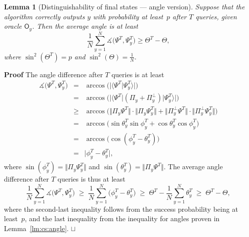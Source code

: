 \documentclass{article}
\newtheorem{lemma}[theorem]{Lemma}
\def\squareforqed{\hbox{\rlap{$\sqcap$}$\sqcup$}}
\def\qed{\ifmmode\squareforqed\else{\unskip\nobreak\hfil
\penalty50\hskip1em\null\nobreak\hfil\squareforqed
\parfillskip=0pt\finalhyphendemerits=0\endgraf}\fi}
\newenvironment{proof}{\begin{trivlist}\item[]{\flushleft\bf Proof }}
{\qed\end{trivlist}}
\newcommand{\op}[1]{\mathsf{#1}}
\newcommand{\proj}{\mathsf{\Pi}}
\begin{document}
\begin{lemma}
[Distinguishability of final states --- angle version]
\label{lm:final:angle}
Suppose that the algorithm correctly outputs $y$ with probability at
least~$p$ after $T$ queries, given oracle $\op{O}_y$.  Then the
average angle is at least
\begin{equation}
  \frac{1}{N}\sum\limits_{y=1}^{N}
  \measuredangle \big( \Psi^{T},\Psi^{T}_{y}\big)
  \geq \Theta^{T}-\Theta,
\end{equation}
where $\sin^2(\Theta^T) = p$ and $\sin^2(\Theta) = \frac{1}{N}$.
\end{lemma}

\begin{proof}
  The angle difference after $T$ queries is at least
\begin{eqnarray*}
  \measuredangle \big(\Psi^{T}, \Psi^{T}_{y}\big) 
  &=& \arccos \big( \big\vert \langle \Psi^{T} \vert \Psi^{T}_{y}\rangle \big\vert\big) \\
  &=& \arccos \big( \big\vert \langle \Psi^{T} \vert (\proj_y + \proj_y^{\perp}) \vert
  \Psi^{T}_{y}\rangle \big\vert\big) \\
  &\geq& \arccos \big( 
  \big\Vert \proj_y \Psi^{T} \big\Vert \cdot
  \big\Vert \proj_y \Psi^{T}_{y} \big\Vert +
  \big\Vert \proj_y^{\perp} \Psi^{T} \big\Vert \cdot
  \big\Vert \proj_y^{\perp} \Psi^{T}_{y} \big\Vert \big)\\
  &=&\arccos \big( \sin \theta_{y}^{T}\sin \phi_{y}^{T} +
  \cos \theta_{y}^{T} \cos \phi_{y}^{T}\big) \\
  &=&\arccos \big(\cos (\phi_{y}^{T} - \theta_{y}^{T})\big) \\
  &=&\big\vert \phi_{y}^{T} - \theta_{y}^{T}\big\vert,
\end{eqnarray*}%
where $\sin(\phi_y^T) = \Vert\proj_y \Psi_y^T\Vert$ and
$\sin(\theta_y^T) = \Vert\proj_y \Psi^T\Vert$.  The average angle
difference after $T$ queries is thus at least
\begin{equation*}
  \frac{1}{N}\sum\limits_{y=1}^{N} \measuredangle \big( \Psi^{T}, \Psi^{T}_{y}\big) 
  \;\geq\; \frac{1}{N}\sum\limits_{y=1}^{N} \big( \phi_{y}^{T} - \theta_{y}^{T}\big) 
  \;\geq\; \Theta^{T}-\frac{1}{N} \sum\limits_{y=1}^{N} \theta_{y}^{T} 
  \;\geq\; \Theta^{T}-\Theta, 
\end{equation*}
where the second-last inequality follows from the success probability
being at least~$p$, and the last inequality from the inequality for
angles proven in Lemma~\ref{lm:cs:angle}.
\end{proof}
\end{document}
